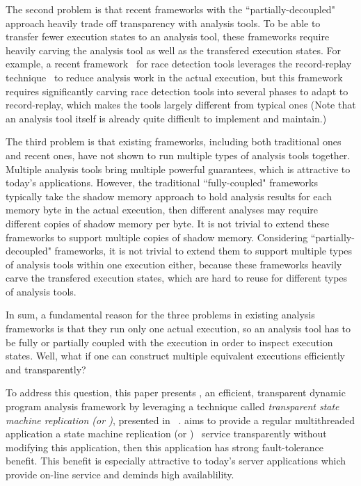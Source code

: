 The second problem is that recent frameworks with the ``partially-decoupled"
approach heavily trade off transparency with analysis tools. To be able to
transfer fewer execution states to an analysis tool, these frameworks require
heavily carving the analysis tool as well as the transfered execution states.
For example, a recent framework~\cite{wester:parallelizing:asplos13} for race
detection tools leverages the record-replay
technique~\cite{scribe:sigmetrics2010, respec:asplos10, racepro:sosp11} to
reduce analysis work in the actual execution, but this framework
requires significantly carving race detection tools into several phases to adapt
to record-replay, which makes the tools largely different from typical ones
(Note that an analysis tool itself is already quite difficult to implement and
maintain.)


The third problem is that existing frameworks, including both traditional ones
and recent ones, have not shown to run multiple types of analysis tools 
together. Multiple analysis tools bring multiple powerful
guarantees, which is attractive to today's applications. However, the
traditional ``fully-coupled" frameworks typically take the shadow memory 
approach to hold analysis results for each memory byte in the actual execution, 
then different analyses may require different copies of shadow memory per byte. 
It is not trivial to extend these frameworks to support multiple copies of 
shadow memory. Considering ``partially-decoupled" frameworks, it is not trivial 
to extend them to support multiple types of analysis tools within one execution 
either, because these frameworks heavily carve the transfered execution states, 
which are hard to reuse for different types of analysis tools.


In sum, a fundamental reason for the three problems in existing analysis 
frameworks is that they run only one actual execution, so an analysis tool has
to be fully or partially coupled with the execution in order to inspect
execution states. Well, what if one can construct multiple equivalent
executions efficiently and transparently?




To address this question, this paper presents \xxx, an efficient, 
transparent dynamic program analysis framework by leveraging a technique called 
\emph{transparent state machine replication (or \tsmr)}, presented in 
\repbox~\cite{repbox:sosp15}. \tsmr aims to provide a regular 
multithreaded application a state machine replication (or 
\smr)~\cite{paxos:simple, paxos:practical, paxos} service transparently without modifying 
this application, then this application has strong fault-tolerance benefit. 
This benefit is especially attractive to today's server applications which 
provide on-line service and deminds high availablility.


